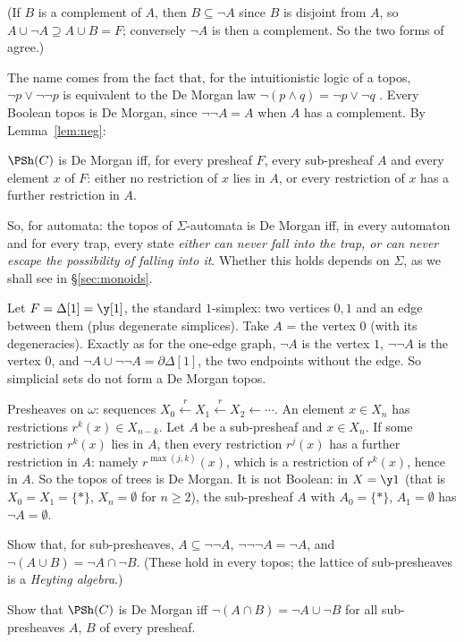 (If $B$ is a complement of $A$, then $B\subseteq\neg A$ since $B$ is disjoint from $A$, so $A\cup\neg A\supseteq A\cup B = F$; conversely $\neg A$ is then a complement. So the two forms of  agree.)

The name  comes from the fact that, for the intuitionistic logic of a topos, $\neg p\vee\neg\neg p$ is equivalent to the De Morgan law $\neg(p\wedge q) = \neg p\vee\neg q$ \cite{johnstone-demorgan}. Every Boolean topos is De Morgan, since $\neg\neg A = A$ when $A$ has a complement. By Lemma~\ref{lem:neg}:

\begin{lemma}\label{lem:dmpointwise}
$\PSh(C)$ is De Morgan iff, for every presheaf $F$, every sub-presheaf $A$ and every element $x$ of $F$: either no restriction of $x$ lies in $A$, or every restriction of $x$ has a further restriction in $A$.
\end{lemma}

So, for automata: the topos of $\Sigma$-automata is De Morgan iff, in every automaton and for every trap, every state \emph{either can never fall into the trap, or can never escape the possibility of falling into it}. Whether this holds depends on $\Sigma$, as we shall see in \S\ref{sec:monoids}.

\begin{example}\label{ex:Delta1}
Let $F = \Delta[1] = \y[1]$, the standard $1$-simplex: two vertices $0,1$ and an edge between them (plus degenerate simplices). Take $A$ = the vertex $0$ (with its degeneracies). Exactly as for the one-edge graph, $\neg A$ is the vertex $1$, $\neg\neg A$ is the vertex $0$, and $\neg A\cup\neg\neg A = \partial\Delta[1]$, the two endpoints without the edge. So simplicial sets do not form a De Morgan topos.
\end{example}

\begin{example}\label{ex:trees}
Presheaves on $\omega$: sequences $X_0\xleftarrow{r}X_1\xleftarrow{r}X_2\leftarrow\cdots$. An element $x\in X_n$ has restrictions $r^k(x)\in X_{n-k}$. Let $A$ be a sub-presheaf and $x\in X_n$. If some restriction $r^k(x)$ lies in $A$, then every restriction $r^j(x)$ has a further restriction in $A$: namely $r^{\max(j,k)}(x)$, which is a restriction of $r^k(x)$, hence in $A$. So the topos of trees is De Morgan. It is not Boolean: in $X = \y 1$ (that is $X_0 = X_1 = \{\ast\}$, $X_n = \emptyset$ for $n\ge 2$), the sub-presheaf $A$ with $A_0 = \{\ast\}$, $A_1 = \emptyset$ has $\neg A = \emptyset$.
\end{example}

\begin{exercise}\label{exo:heyting}
Show that, for sub-presheaves, $A\subseteq\neg\neg A$, $\neg\neg\neg A = \neg A$, and $\neg(A\cup B) = \neg A\cap\neg B$. (These hold in every topos; the lattice of sub-presheaves is a \emph{Heyting algebra}.)
\end{exercise}

\begin{exercise}\label{exo:dmlaw}
Show that $\PSh(C)$ is De Morgan iff $\neg(A\cap B) = \neg A\cup\neg B$ for all sub-presheaves $A$, $B$ of every presheaf.
\end{exercise}
